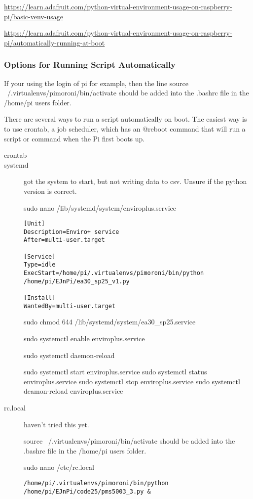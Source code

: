 \documentclass{article}
\begin{document}
\url{https://learn.adafruit.com/python-virtual-environment-usage-on-raspberry-pi/basic-venv-usage}

\url{https://learn.adafruit.com/python-virtual-environment-usage-on-raspberry-pi/automatically-running-at-boot}

\subsubsection{Options for Running Script Automatically}

If your using the login of pi for example, then the line source ~/.virtualenvs/pimoroni/bin/activate should be added into the .bashrc file in the /home/pi users folder.

There are several ways to run a script automatically on boot. The easiest way is to use crontab, a job scheduler, which has an @reboot command that will run a script or command when the Pi first boots up.

\begin{description}
\item[crontab]
\item[systemd] got the system to start, but not writing data to csv. Unsure if the python version is correct.


sudo nano /lib/systemd/system/enviroplus.service

\begin{verbatim}
[Unit]
Description=Enviro+ service
After=multi-user.target

[Service]
Type=idle
ExecStart=/home/pi/.virtualenvs/pimoroni/bin/python /home/pi/EJnPi/ea30_sp25_v1.py

[Install]
WantedBy=multi-user.target
\end{verbatim}

sudo chmod 644 /lib/systemd/system/ea30\_sp25.service

sudo systemctl enable enviroplus.service

sudo systemctl daemon-reload


sudo systemctl start enviroplus.service
sudo systemctl status enviroplus.service
sudo systemctl stop enviroplus.service
sudo systemctl deamon-reload enviroplus.service



\item[rc.local] haven't tried this yet.

 source ~/.virtualenvs/pimoroni/bin/activate should be added into the .bashrc file in the /home/pi users folder.

sudo nano /etc/rc.local

\begin{verbatim}
/home/pi/.virtualenvs/pimoroni/bin/python /home/pi/EJnPi/code25/pms5003_3.py &
\end{verbatim}

\end{description}
\end{document}
